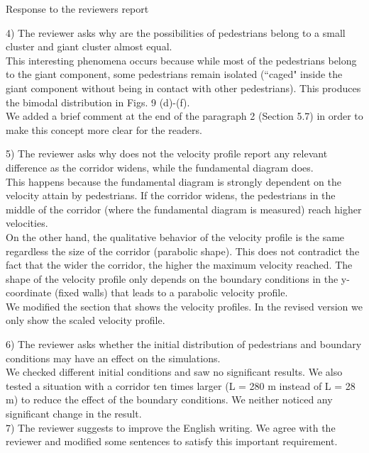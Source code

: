 \documentclass[a4paper,12pt]{letter}
\begin{document}
\begin{letter}{Response to the reviewers report}
{4) The reviewer asks why are the possibilities of pedestrians belong to a small cluster and giant cluster almost equal. \\

This interesting phenomena occurs because while most of the pedestrians belong to the giant component, some pedestrians remain isolated (``caged" inside the giant component without being in contact with other pedestrians). This produces the bimodal distribution in Figs. 9 (d)-(f).\\

We added a brief comment at the end of the paragraph 2 (Section 5.7) in order to make this concept more clear for the readers.   

5) The reviewer asks why does not the velocity profile report any relevant difference as the corridor widens, while the fundamental diagram does.\\

This happens because the fundamental diagram is strongly dependent on the velocity attain by pedestrians. If the corridor widens, the pedestrians in the middle of the corridor (where the fundamental diagram is measured) reach higher velocities. \\

On the other hand, the qualitative behavior of the velocity profile is the same regardless the size of the corridor (parabolic shape). This does not contradict the fact that the wider the corridor, the higher the maximum velocity reached. The shape of the velocity profile only depends on the boundary conditions in the y-coordinate (fixed walls) that leads to a parabolic velocity profile. \\

We modified the section that shows the velocity profiles. In the revised version we only show the scaled velocity profile. 

6) The reviewer asks whether the initial distribution of pedestrians and boundary conditions may have an effect on the simulations.\\

We checked different initial conditions and saw no significant results. We also tested a situation with a corridor ten times larger (L = 280 m instead of L = 28 m) to reduce the effect of the boundary conditions. We neither noticed any significant change in the result. \\

7) The reviewer suggests to improve the English writing. We agree with the reviewer and modified some sentences to satisfy this important requirement.  \\

}
\end{letter}
\end{document}
